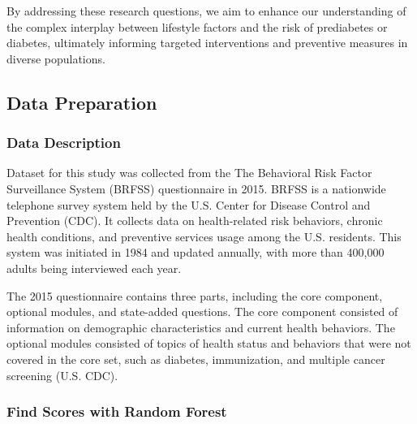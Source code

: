 \documentclass[
  12pt,
]{article}
\begin{document}
By addressing these research questions, we aim to enhance our
understanding of the complex interplay between lifestyle factors and the
risk of prediabetes or diabetes, ultimately informing targeted
interventions and preventive measures in diverse populations.

\hypertarget{data-preparation}{%
\subsection{Data Preparation}\label{data-preparation}}

\hypertarget{data-description}{%
\subsubsection{Data Description}\label{data-description}}

Dataset for this study was collected from the The Behavioral Risk Factor
Surveillance System (BRFSS) questionnaire in 2015. BRFSS is a nationwide
telephone survey system held by the U.S. Center for Disease Control and
Prevention (CDC). It collects data on health-related risk behaviors,
chronic health conditions, and preventive services usage among the U.S.
residents. This system was initiated in 1984 and updated annually, with
more than 400,000 adults being interviewed each year.

The 2015 questionnaire contains three parts, including the core
component, optional modules, and state-added questions. The core
component consisted of information on demographic characteristics and
current health behaviors. The optional modules consisted of topics of
health status and behaviors that were not covered in the core set, such
as diabetes, immunization, and multiple cancer screening (U.S. CDC).

\hypertarget{find-scores-with-random-forest}{%
\subsubsection{Find Scores with Random
Forest}\label{find-scores-with-random-forest}}
\end{document}
